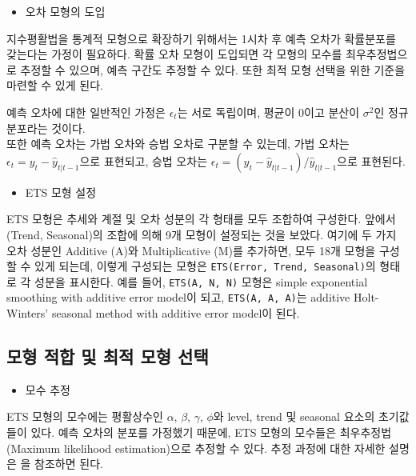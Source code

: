 \documentclass[
]{book}
\providecommand{\tightlist}{%
  \setlength{\itemsep}{0pt}\setlength{\parskip}{0pt}}
\begin{document}
\begin{itemize}
\tightlist
\item
  오차 모형의 도입
\end{itemize}

지수평활법을 통계적 모형으로 확장하기 위해서는 1시차 후 예측 오차가 확률분포를 갖는다는 가정이 필요하다. 확률 오차 모형이 도입되면 각 모형의 모수를 최우추정법으로 추정할 수 있으며, 예측 구간도 추정할 수 있다. 또한 최적 모형 선택을 위한 기준을 마련할 수 있게 된다.

예측 오차에 대한 일반적인 가정은 \(\epsilon_{t}\)는 서로 독립이며, 평균이 0이고 분산이 \(\sigma^{2}\)인 정규분포라는 것이다.\\
또한 예측 오차는 가법 오차와 승법 오차로 구분할 수 있는데, 가법 오차는 \(\epsilon_{t} = y_{t} - \hat{y}_{t|t-1}\)으로 표현되고, 승법 오차는 \(\epsilon_{t} = (y_{t} - \hat{y}_{t|t-1})/\hat{y}_{t|t-1}\)으로 표현된다.

\begin{itemize}
\tightlist
\item
  ETS 모형 설정
\end{itemize}

ETS 모형은 추세와 계절 및 오차 성분의 각 형태를 모두 조합하여 구성한다. 앞에서 (Trend, Seasonal)의 조합에 의해 9개 모형이 설정되는 것을 보았다. 여기에 두 가지 오차 성분인 Additive (A)와 Multiplicative (M)를 추가하면, 모두 18개 모형을 구성할 수 있게 되는데, 이렇게 구성되는 모형은 \texttt{ETS(Error,\ Trend,\ Seasonal)}의 형태로 각 성분을 표시한다. 예를 들어, \texttt{ETS(A,\ N,\ N)} 모형은 simple exponential smoothing with additive error model이 되고, \texttt{ETS(A,\ A,\ A)}는 additive Holt-Winters' seasonal method with additive error model이 된다.

\hypertarget{uxbaa8uxd615-uxc801uxd569-uxbc0f-uxcd5cuxc801-uxbaa8uxd615-uxc120uxd0dd}{%
\subsection{모형 적합 및 최적 모형 선택}\label{uxbaa8uxd615-uxc801uxd569-uxbc0f-uxcd5cuxc801-uxbaa8uxd615-uxc120uxd0dd}}

\begin{itemize}
\tightlist
\item
  모수 추정
\end{itemize}

ETS 모형의 모수에는 평활상수인 \(\alpha\), \(\beta\), \(\gamma\), \(\phi\)와 level, trend 및 seasonal 요소의 초기값들이 있다. 예측 오차의 분포를 가정했기 때문에, ETS 모형의 모수들은 최우추정법 (Maximum likelihood estimation)으로 추정할 수 있다. 추정 과정에 대한 자세한 설명은 \citep{hyndman2018}을 참조하면 된다.
\end{document}
